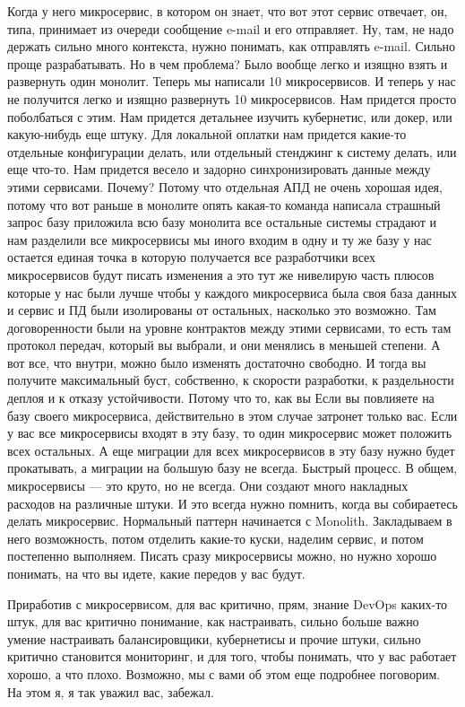 \documentclass[12pt]{article} %
\begin{document}
Когда у него микросервис, в котором он знает, что вот этот сервис отвечает, он, типа, принимает из очереди сообщение e-mail и его отправляет.  Ну, там, не надо держать сильно много контекста, нужно понимать, как отправлять e-mail.  Сильно проще разрабатывать.  Но в чем проблема?  Было вообще легко и изящно взять и развернуть один монолит.  Теперь мы написали 10 микросервисов.  И теперь у нас не получится легко и изящно развернуть 10 микросервисов.  Нам придется просто поболбаться с этим.  Нам придется детальнее изучить кубернетис, или докер, или какую-нибудь еще штуку.  Для локальной оплатки нам придется какие-то отдельные конфигурации делать, или отдельный стенджинг к систему делать, или еще что-то.  Нам придется весело и задорно синхронизировать данные между этими сервисами.  Почему? Потому что отдельная АПД не очень хорошая идея, потому что вот раньше в монолите опять какая-то команда написала страшный запрос базу приложила всю базу монолита все остальные системы страдают и нам разделили все микросервисы мы иного входим в одну и ту же базу у нас остается единая точка в которую получается все разработчики всех микросервисов будут писать изменения а это тут же нивелирую часть плюсов которые у нас были лучше чтобы у каждого микросервиса была своя база данных и сервис и ПД были изолированы от остальных, насколько это возможно. Там договоренности были на уровне контрактов между этими сервисами, то есть там протокол передач, который вы выбрали, и они менялись в меньшей степени. А вот все, что внутри, можно было изменять достаточно свободно. И тогда вы получите максимальный буст, собственно, к скорости разработки, к раздельности деплоя и к отказу устойчивости. Потому что то, как вы Если вы повлияете на базу своего микросервиса, действительно в этом случае затронет только вас.  Если у вас все микросервисы входят в эту базу, то один микросервис может положить всех остальных.  А еще миграции для всех микросервисов в эту базу нужно будет прокатывать, а миграции на большую базу не всегда.  Быстрый процесс.  В общем, микросервисы — это круто, но не всегда.  Они создают много накладных расходов на различные штуки.  И это всегда нужно помнить, когда вы собираетесь делать микросервис.  Нормальный паттерн начинается с Monolith.  Закладываем в него возможность, потом отделить какие-то куски, наделим сервис, и потом постепенно выполняем.  Писать сразу микросервисы можно, но нужно хорошо понимать, на что вы идете, какие передов у вас будут.

Приработив с микросервисом, для вас критично, прям, знание DevOps каких-то штук, для вас критично понимание, как настраивать,  сильно больше важно умение настраивать балансировщики, кубернетисы и прочие штуки, сильно критично становится мониторинг, и для того, чтобы понимать, что у вас работает хорошо, а что плохо.  Возможно, мы с вами об этом еще подробнее поговорим.  На этом я, я так уважил вас, забежал.

	
\end{document}

